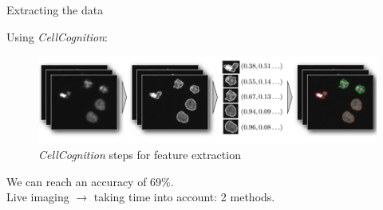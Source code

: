 \documentclass{beamer}
\begin{document}

\begin{frame}{Extracting the data}

Using \textit{CellCognition}:
\begin{figure}[!ht]
\centering
\includegraphics[width=\textwidth]{Images/features_extract.png}
\caption{\textit{CellCognition} steps for feature extraction}
\label{extract}
\end{figure}

We can reach an accuracy of 69\%. \\
Live imaging $\longrightarrow$ taking time into account: 2 methods.
\end{frame}

\iffalse
\end{document}
